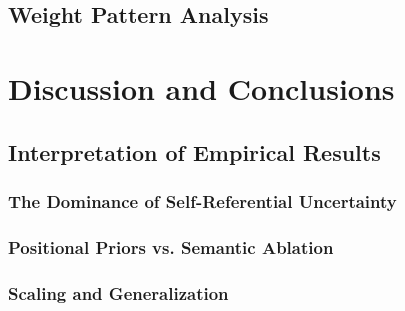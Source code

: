 \documentclass[a4paper,oneside,10pt,ngerman,english]{scrbook}
\begin{document}
\section{Weight Pattern Analysis}

\chapter{Discussion and Conclusions}
\label{ch:discussion}

\section{Interpretation of Empirical Results}
\subsection{The Dominance of Self-Referential Uncertainty}

\subsection{Positional Priors vs. Semantic Ablation}

\subsection{Scaling and Generalization}
\end{document}
